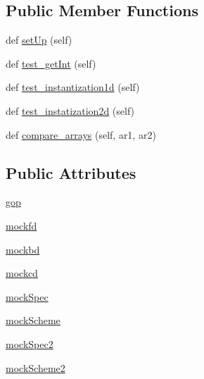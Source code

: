 \subsection*{Public Member Functions}
\begin{DoxyCompactItemize}
\item 
def \hyperlink{classtest__gridoperator_1_1testGridOp_af1e41b5ede4acae14c2e5017298d9e5b}{set\+Up} (self)
\item 
def \hyperlink{classtest__gridoperator_1_1testGridOp_a1f89e4e9e0412401b83eff04711dc1ee}{test\+\_\+get\+Int} (self)
\item 
def \hyperlink{classtest__gridoperator_1_1testGridOp_a24e9b53f3daa1df51e1f97f207216f76}{test\+\_\+instantization1d} (self)
\item 
def \hyperlink{classtest__gridoperator_1_1testGridOp_a724308f1be4ab20497d0b4c86f8f1b8e}{test\+\_\+instatization2d} (self)
\item 
def \hyperlink{classtest__gridoperator_1_1testGridOp_af52186e45ef2aff81bf450fbd27cc96e}{compare\+\_\+arrays} (self, ar1, ar2)
\end{DoxyCompactItemize}
\subsection*{Public Attributes}
\begin{DoxyCompactItemize}
\item 
\hyperlink{classtest__gridoperator_1_1testGridOp_ad9a93de7bf4b496c7afeafcda1f268ae}{gop}
\item 
\hyperlink{classtest__gridoperator_1_1testGridOp_ab46933a54e3a54b567f6aa5cc0c8ead1}{mockfd}
\item 
\hyperlink{classtest__gridoperator_1_1testGridOp_a71ad74ee448d9d03137a272a38439e42}{mockbd}
\item 
\hyperlink{classtest__gridoperator_1_1testGridOp_a0d63883180b1fd6fab4b329a387cfcd3}{mockcd}
\item 
\hyperlink{classtest__gridoperator_1_1testGridOp_a17689aff389b7e433b70caa6e266fdc8}{mock\+Spec}
\item 
\hyperlink{classtest__gridoperator_1_1testGridOp_af1102620f7eaa075187a8b081aa13bf5}{mock\+Scheme}
\item 
\hyperlink{classtest__gridoperator_1_1testGridOp_addc781f383467d92801549c403e0e966}{mock\+Spec2}
\item 
\hyperlink{classtest__gridoperator_1_1testGridOp_a290bd5a86c3cdd65bd63ff066a4247b8}{mock\+Scheme2}
\end{DoxyCompactItemize}


